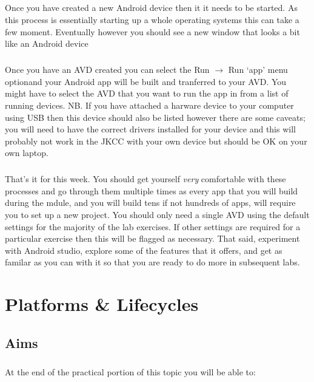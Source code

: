 \documentclass[12pt, a4paper, twoside]{book}
\begin{document}
\paragraph{} Once you have created a new Android device then it it needs to be started. As this process is essentially starting up a whole operating systems this can take a few moment. Eventually however you should see a new window that looks a bit like an Android device

\paragraph{} Once you have an AVD created you can select the Run $\to$ Run `app' menu optionand your Android app will be built and tranferred to your AVD. You might have to select the AVD that you want to run the app in from a list of running devices. NB. If you have attached a harware device to your computer using USB then this device should also be listed however there are some caveats; you will need to have the correct drivers installed for your device and this will probably not work in the JKCC with your own device but should be OK on your own laptop.

\paragraph{} That's it for this week. You should get yourself \emph{very} comfortable with these processes and go through them multiple times as every app that you will build during the mdule, and you will build tens if not hundreds of apps, will require you to set up a new project. You should only need a single AVD using the default settings for the majority of the lab exercises. If other settings are required for a particular exercise then this will be flagged as necessary. That said, experiment with Android studio, explore some of the features that it offers, and get as familar as you can with it so that you are ready to do more in subsequent labs.




\chapter{Platforms \& Lifecycles}

\section{Aims}
\paragraph{} At the end of the practical portion of this topic you will be able to:
\end{document}
